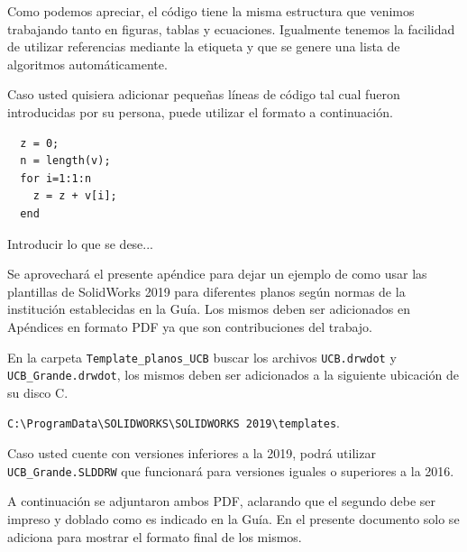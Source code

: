 Como podemos apreciar, el código tiene la misma estructura que venimos trabajando tanto en figuras, tablas y ecuaciones. Igualmente tenemos la facilidad de utilizar referencias mediante la etiqueta y que se genere una lista de algoritmos automáticamente. 

Caso usted quisiera adicionar pequeñas líneas de código tal cual fueron introducidas por su persona, puede utilizar el formato a continuación.

\begin{lstlisting}[frame=single]
  % suma de los elementos de un vector
  z = 0;
  n = length(v);
  for i=1:1:n
    z = z + v[i];
  end
\end{lstlisting}

Introducir lo que se dese...

Se aprovechará el presente apéndice para dejar un ejemplo de como usar las plantillas de SolidWorks 2019 para diferentes planos según normas de la institución establecidas en la Guía. Los mismos deben ser adicionados en Apéndices en formato PDF ya que son contribuciones del trabajo. 

En la carpeta \verb|Template_planos_UCB| buscar los archivos \verb|UCB.drwdot| y \verb|UCB_Grande.drwdot|, los mismos deben ser adicionados a la siguiente ubicación de su disco C.

\verb|C:\ProgramData\SOLIDWORKS\SOLIDWORKS 2019\templates|. 

Caso usted cuente con versiones inferiores a la 2019, podrá utilizar \verb|UCB_Grande.SLDDRW| que funcionará para versiones iguales o superiores a la 2016. 

A continuación se adjuntaron ambos PDF, aclarando que el segundo debe ser impreso y doblado como es indicado en la Guía. En el presente documento solo se adiciona para mostrar el formato final de los mismos. 



